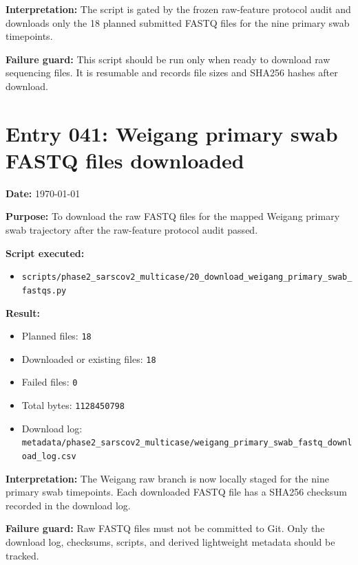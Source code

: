 \textbf{Interpretation:} The script is gated by the frozen raw-feature protocol audit and downloads only the 18 planned submitted FASTQ files for the nine primary swab timepoints.

\textbf{Failure guard:} This script should be run only when ready to download raw sequencing files. It is resumable and records file sizes and SHA256 hashes after download.


\section*{Entry 041: Weigang primary swab FASTQ files downloaded}

\textbf{Date:} \today

\textbf{Purpose:} To download the raw FASTQ files for the mapped Weigang primary swab trajectory after the raw-feature protocol audit passed.

\textbf{Script executed:}
\begin{itemize}
    \item \texttt{scripts/phase2\_sarscov2\_multicase/20\_download\_weigang\_primary\_swab\_fastqs.py}
\end{itemize}

\textbf{Result:}
\begin{itemize}
    \item Planned files: \texttt{18}
    \item Downloaded or existing files: \texttt{18}
    \item Failed files: \texttt{0}
    \item Total bytes: \texttt{1128450798}
    \item Download log: \texttt{metadata/phase2\_sarscov2\_multicase/weigang\_primary\_swab\_fastq\_download\_log.csv}
\end{itemize}

\textbf{Interpretation:} The Weigang raw branch is now locally staged for the nine primary swab timepoints. Each downloaded FASTQ file has a SHA256 checksum recorded in the download log.

\textbf{Failure guard:} Raw FASTQ files must not be committed to Git. Only the download log, checksums, scripts, and derived lightweight metadata should be tracked.

